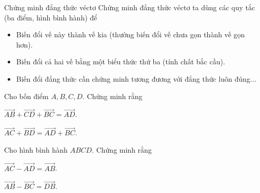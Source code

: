\begin{dang}{Chứng minh đẳng thức véctơ}
    Chứng minh đẳng thức véctơ ta dùng các quy tắc (ba điểm, hình bình hành) để
    \begin{itemize}
        \item Biến đổi vế này thành vế kia (thường biến đổi vế chưa gọn thành vế gọn hơn).
        \item Biến đổi cả hai vế bằng một biểu thức thứ ba (tính chất bắc cầu).
        \item Biến đổi đẳng thức cần chứng minh tương đương với đẳng thức luôn đúng...
    \end{itemize}
\end{dang}
\begin{vd}%
    Cho bốn điểm $A,B,C,D$. Chứng minh rằng 
    \begin{listEX}[2]
        \item $\vec{AB}+\vec{CD}+\vec{BC}=\vec{AD}$.
        \item $\vec{AC}+\vec{BD}=\vec{AD}+\vec{BC}$.
    \end{listEX}
\end{vd}

\begin{vd}%
    Cho hình bình hành $ABCD$. Chứng minh rằng
    \begin{listEX}[2]
        \item $\vec{AC}-\vec{AD}=\vec{AB}$.
        \item $\vec{AB}-\vec{BC}=\vec{DB}$.
    \end{listEX}
\end{vd}

